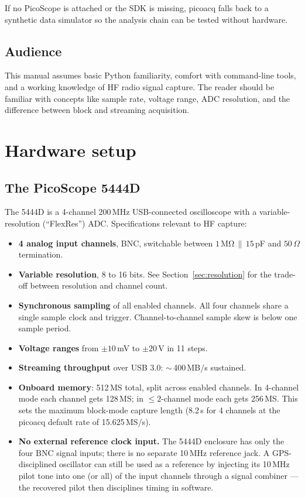 \documentclass[11pt]{article}
\begin{document}
If no PicoScope is attached or the SDK is missing, \textsf{picoacq}
falls back to a synthetic data simulator so the analysis chain can be
tested without hardware.

\subsection{Audience}

This manual assumes basic Python familiarity, comfort with command-line
tools, and a working knowledge of HF radio signal capture.  The reader
should be familiar with concepts like sample rate, voltage range,
ADC resolution, and the difference between block and streaming
acquisition.

\section{Hardware setup}

\subsection{The PicoScope 5444D}

The 5444D is a 4-channel 200\,MHz USB-connected oscilloscope with a
variable-resolution (``FlexRes'') ADC.  Specifications relevant to
HF capture:

\begin{itemize}\itemsep=2pt
\item \textbf{4 analog input channels}, BNC, switchable between
      $1\,\mathrm{M\Omega}\,\|\,15$\,pF and $50\,\Omega$ termination.
\item \textbf{Variable resolution}, 8 to 16 bits.  See
      Section~\ref{sec:resolution} for the trade-off between resolution
      and channel count.
\item \textbf{Synchronous sampling} of all enabled channels.  All four
      channels share a single sample clock and trigger.  Channel-to-channel
      sample skew is below one sample period.
\item \textbf{Voltage ranges} from $\pm 10$\,mV to $\pm 20$\,V in 11
      steps.
\item \textbf{Streaming throughput} over USB 3.0: $\sim$\,400\,MB/s
      sustained.
\item \textbf{Onboard memory}: 512\,MS total, split across enabled
      channels.  In 4-channel mode each channel gets 128\,MS; in
      $\le 2$-channel mode each gets 256\,MS.  This sets the
      maximum block-mode capture length (8.2\,s for 4 channels at the
      \textsf{picoacq} default rate of 15.625\,MS/s).
\item \textbf{No external reference clock input.}  The 5444D
      enclosure has only the four BNC signal inputs; there is no
      separate 10\,MHz reference jack.  A GPS-disciplined oscillator
      can still be used as a reference by injecting its 10\,MHz pilot
      tone into one (or all) of the input channels through a signal
      combiner --- the recovered pilot then disciplines timing in
      software.
\end{itemize}
\end{document}
